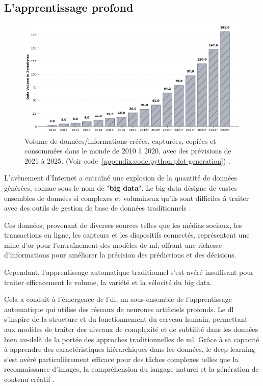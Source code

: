 \subsection{L'apprentissage profond}

\begin{figure}[H]
    \centering
    \includegraphics[width=15cm]{gfx/fig-big-data.png}
    \caption{Volume de données/informations créées, capturées, copiées et consommées dans le monde de 2010 à 2020, avec des prévisions de 2021 à 2025. (Voir code~\ref{appendix:code:python:plot-generation}) \cite{datagenerate2010}.}
    \label{fig:datagenerated}
\end{figure}

L'avènement d'Internet a entraîné une explosion de la quantité de données générées, connue sous le nom de "\textbf{big data}". Le big data désigne de vastes ensembles de données si complexes et volumineux qu'ils sont difficiles à traiter avec des outils de gestion de base de données traditionnels \cite{Ratner_2012}.

Ces données, provenant de diverses sources telles que les médias sociaux, les transactions en ligne, les capteurs et les dispositifs connectés, représentent une mine d'or pour l'entraînement des modèles de \ac{ml}, offrant une richesse d'informations pour améliorer la précision des prédictions et des décisions.

Cependant, l'apprentissage automatique traditionnel s'est avéré insuffisant pour traiter efficacement le volume, la variété et la vélocité du big data. 

Cela a conduit à l'émergence de l'\acf{dl}, un sous-ensemble de l'apprentissage automatique qui utilise des réseaux de neurones artificiels profonds. Le \ac{dl} s'inspire de la structure et du fonctionnement du cerveau humain, permettant aux modèles de traiter des niveaux de complexité et de subtilité dans les données bien au-delà de la portée des approches traditionnelles de \ac{ml}. Grâce à sa capacité à apprendre des caractéristiques hiérarchiques dans les données, le deep learning s'est avéré particulièrement efficace pour des tâches complexes telles que la reconnaissance d'images, la compréhension du langage naturel et la génération de contenu créatif \cite{Foster_2019}.

